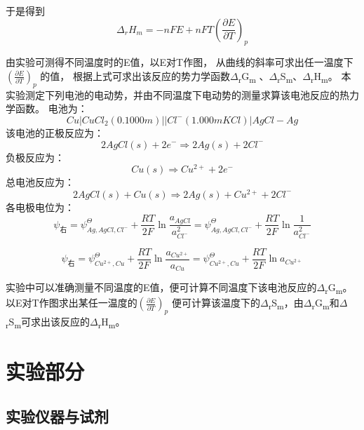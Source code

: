 \documentclass[11pt]{report}
\begin{document}
于是得到
\[
   \Delta_{r}H_{m}=-nFE+nFT\left(\frac{\partial E}{\partial T}\right)_{p}
   \]

由实验可测得不同温度时的E值，以E对T作图，
从曲线的斜率可求出任一温度下\(\left(\frac{\partial E}{\partial T}\right)_{p}\) 的值，
根据上式可求出该反应的势力学函数\(\Delta\)\textsubscript{r}G\textsubscript{m} 、\(\Delta\)\textsubscript{r}S\textsubscript{m}、\(\Delta\)\textsubscript{r}H\textsubscript{m}。
本实验测定下列电池的电动势，并由不同温度下电动势的测量求算该电池反应的热力学函数。
电池为：
\[
   Cu|CuCl_{2}(0.1000m)||Cl^{-}(1.000mKCl)|AgCl-Ag
   \]
该电池的正极反应为：
\[
   2AgCl(s)+2e^{-}\Longrightarrow 2Ag(s)+2Cl^{-}
   \]
负极反应为：
\[
   Cu(s)\Longrightarrow Cu^{2+}+2e^{-}
   \]
总电池反应为：
\[
   2AgCl(s)+Cu(s)\Longrightarrow 2Ag(s)+Cu^{2+}+2Cl^{-}
   \]
各电极电位为：
\[
   \psi_{右}=\psi^{\Theta}_{Ag,AgCl,Cl^{-}}+\frac{RT}{2F}\ln\frac{a_{AgCl}}{a^{2}_{Cl^{-}}}
   =\psi^{\Theta}_{Ag,AgCl,Cl^{-}}+\frac{RT}{2F}\ln\frac{1}{a^{2}_{Cl^{-}}}
   \]

\[
   \psi_{右}=\psi^{\Theta}_{Cu^{2+},Cu}+\frac{RT}{2F}\ln\frac{a_{Cu^{2+}}}{a_{Cu}}=
   \psi^{\Theta}_{Cu^{2+},Cu}+\frac{RT}{2F}\ln a_{Cu^{2+}}
   \]

实验中可以准确测量不同温度的E值，便可计算不同温度下该电池反应的\(\Delta\)\textsubscript{r}G\textsubscript{m}。
以E对T作图求出某任一温度的\(\left(\frac{\partial E}{\partial T}\right)_{p}\) 便可计算该温度下的\(\Delta\)\textsubscript{r}S\textsubscript{m}，由\(\Delta\)\textsubscript{r}G\textsubscript{m}和\(\Delta\)\textsubscript{r}S\textsubscript{m}可求出该反应的\(\Delta\)\textsubscript{r}H\textsubscript{m}。

\part{实验部分}
\label{sec:org34a3efc}
\chapter{实验仪器与试剂}
\label{sec:orgf6c3b39}
\end{document}
